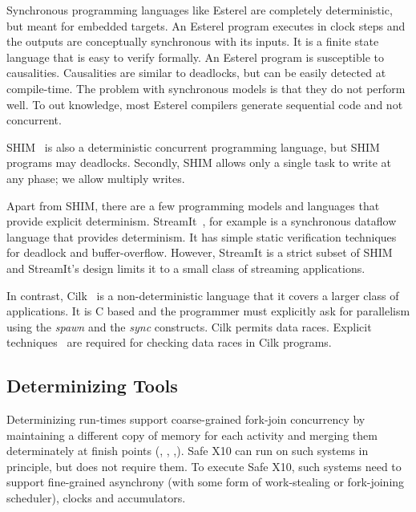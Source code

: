 Synchronous programming languages like Esterel are completely
deterministic, but meant for embedded targets. An Esterel program
executes in clock steps and the outputs are conceptually synchronous
with its inputs.  It is a finite state language that is easy to verify
formally. An Esterel program is susceptible to
causalities. Causalities are similar to deadlocks, but can be easily
detected at compile-time.  The problem with synchronous models is that
they do not perform well. To out knowledge, most Esterel compilers
generate sequential code and not concurrent.

SHIM~\cite{edwards2005shim2,tardieu2006scheduling-independent} is also
a deterministic concurrent programming language, but SHIM programs may
deadlocks.  Secondly, SHIM allows only a single task to write at any
phase; we allow multiply writes.

Apart from SHIM, there are a few programming models and languages that
provide explicit determinism. StreamIt~\cite{thies2001streamit}, for
example is a synchronous dataflow language that provides
determinism. It has simple static verification techniques for deadlock
and buffer-overflow.  However, StreamIt is a strict subset of SHIM and
StreamIt's design limits it to a small class of streaming
applications.



In contrast,
Cilk~\cite{blumofe1995cilk} is a non-deterministic language that it covers a larger
class of applications. It is C based
and the programmer must explicitly ask for parallelism using
the \emph{spawn} and the \emph{sync} constructs.
Cilk permits data races.
Explicit techniques~\cite{cheng1998detecting} are
required for checking data races in Cilk programs.




\subsection{Determinizing Tools}
Determinizing run-times support coarse-grained fork-join concurrency
by maintaining a different copy of memory for each activity and
merging them determinately at finish points (\cite{grace},
\cite{dmp}, \cite{kendo},\cite{determinator}). Safe
X10 can run on such systems in principle, but does not require them.
To execute Safe X10, such systems need to support fine-grained
asynchrony (with some form of work-stealing or fork-joining
scheduler), clocks and accumulators.

